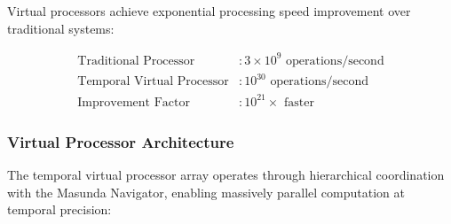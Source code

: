 \documentclass[12pt,a4paper]{article}
\begin{document}
Virtual processors achieve exponential processing speed improvement over traditional systems:

\begin{align}
\text{Traditional Processor} &: 3 \times 10^9 \text{ operations/second} \\
\text{Temporal Virtual Processor} &: 10^{30} \text{ operations/second} \\
\text{Improvement Factor} &: 10^{21}\times \text{ faster}
\end{align}

\subsubsection{Virtual Processor Architecture}

The temporal virtual processor array operates through hierarchical coordination with the Masunda Navigator, enabling massively parallel computation at temporal precision:
\end{document}
